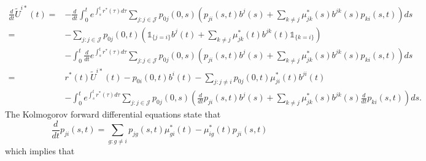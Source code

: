 \documentclass[12pt]{article}
\newcommand{\indic}[1]{\mathds{1}_{ \{ #1 \} }}
\theoremstyle{my_thm}
\begin{document}
\begin{align*}
\frac{d}{dt} \tilde{U}^{i*}(t)=& -\frac{d}{dt} 
\int_0^t e^{\int_s^t r^*(\tau) d\tau} \sum_{j:j \in \mathcal{J}} p_{0j}(0,s) \left(p_{ji}(s,t)   b^{j}(s) + \sum_{k \neq j}  \mu^*_{jk}(s) b^{jk}(s) p_{ki}(s,t) \right) ds
\\
=&
-\sum_{j:j \in \mathcal{J}} p_{0j}(0,t) \left( \indic{j=i}   b^{j}(t) + \sum_{k \neq j}  \mu^*_{jk}(t) b^{jk}(t) \indic{k=i}  \right) 
\\
&-
\int_0^t \frac{d}{dt} e^{\int_s^t r^*(\tau) d\tau} \sum_{j:j \in \mathcal{J}} p_{0j}(0,s) \left(p_{ji}(s,t)   b^{j}(s) + \sum_{k \neq j}  \mu^*_{jk}(s) b^{jk}(s) p_{ki}(s,t) \right) ds
\\
=&
r^*(t)\tilde{U}^{i*}(t)-p_{0i}(0,t) b^{i}(t) -\sum_{j:j \neq i} p_{0j}(0,t) \mu^*_{ji}(t) b^{ji}(t) 
\\
&-
\int_0^t e^{\int_s^t r^*(\tau) d\tau} \sum_{j:j \in \mathcal{J}} p_{0j}(0,s) \left( \frac{d}{dt}p_{ji}(s,t)   b^{j}(s) + \sum_{k \neq j}  \mu^*_{jk}(s) b^{jk}(s) \frac{d}{dt} p_{ki}(s,t) \right) ds.
\end{align*}
The Kolmogorov forward differential equations state that
$$
\frac{d}{dt}p_{ji}(s,t)=\sum_{g:g \neq i} p_{jg}(s,t)\mu^*_{gi}(t) - \mu^*_{ig}(t)p_{ji}(s,t)
$$
which implies that
\end{document}
